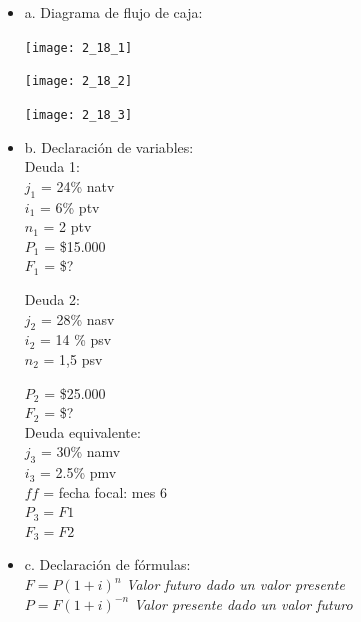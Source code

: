 \begin{itemize}
	\item a. Diagrama de flujo de caja:
	\begin{center}
		\texttt{[image: 2\_18\_1]}\\
	\end{center}
	
	\begin{center}
		\texttt{[image: 2\_18\_2]}\\
	\end{center}
	
		\begin{center}
		\texttt{[image: 2\_18\_3]}\\
	\end{center}
	
	\item b. Declaración de variables:\\
	
	Deuda 1:\\
	$j_{1}$ = 24\% natv\\	
	$i_{1}$ = 6\% ptv\\	
	$n_{1}$ = 2 ptv\\
	
	$P_{1}$ = \$15.000    \\
    $F_{1}$ = \$?
	
	Deuda 2\hspace{5 pt}:\\
	
	$j_{2}$ = 28\% nasv\\	
	$i_{2}$ = 14 \% psv\\	
	$n_{2}$ = 1,5 psv 
	
	$P_{2}$ = \$25.000   \\ 
    $F_{2}$ = \$? \\
	
	Deuda equivalente:\\
	
	$j_{3}$ = 30\% namv\\	
	$i_{3}$  = 2.5\% pmv\\
	
	$ff$ = fecha focal: mes 6\\
    
    $P_{3} = F1$\\    
    $F_{3} = F2$\\
    
	
	\item c. Declaración de fórmulas:\\
	
	$F = P(1+i)^n$\hspace{35 pt} \textit{Valor futuro dado un valor presente}\\
	$P = F(1+i)^{-n}$\hspace{35 pt} \textit{Valor presente dado un valor futuro}\\
	

\end{itemize}
